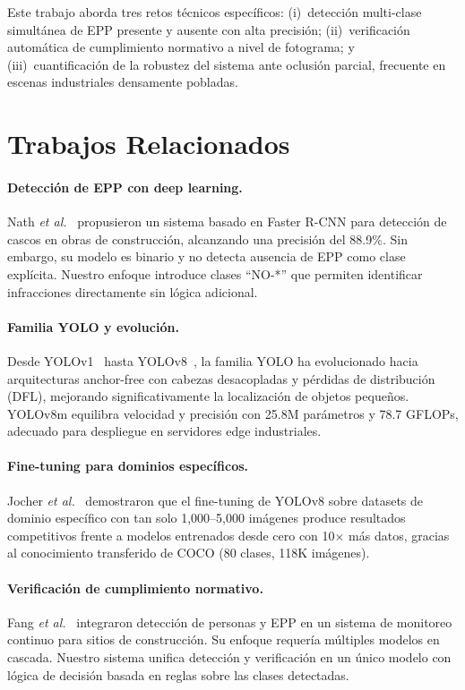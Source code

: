 \documentclass{article}
\begin{document}
Este trabajo aborda tres retos técnicos específicos: (i)~detección
multi-clase simultánea de EPP presente y ausente con alta precisión;
(ii)~verificación automática de cumplimiento normativo a nivel de
fotograma; y (iii)~cuantificación de la robustez del sistema ante
oclusión parcial, frecuente en escenas industriales densamente pobladas.

\section{Trabajos Relacionados}
\label{sec:related}

\paragraph{Detección de EPP con deep learning.}
Nath \emph{et al.}~\cite{nath2020ppe} propusieron un sistema basado en
Faster R-CNN para detección de cascos en obras de construcción,
alcanzando una precisión del 88.9\%. Sin embargo, su modelo es binario
y no detecta ausencia de EPP como clase explícita. Nuestro enfoque
introduce clases ``NO-*'' que permiten identificar infracciones
directamente sin lógica adicional.

\paragraph{Familia YOLO y evolución.}
Desde YOLOv1~\cite{redmon2016yolo} hasta YOLOv8~\cite{jocher2023yolov8},
la familia YOLO ha evolucionado hacia arquitecturas anchor-free con
cabezas desacopladas y pérdidas de distribución (DFL), mejorando
significativamente la localización de objetos pequeños. YOLOv8m
equilibra velocidad y precisión con 25.8M parámetros y 78.7 GFLOPs,
adecuado para despliegue en servidores edge industriales.

\paragraph{Fine-tuning para dominios específicos.}
Jocher \emph{et al.}~\cite{jocher2023yolov8} demostraron que el
fine-tuning de YOLOv8 sobre datasets de dominio específico con tan
solo 1{,}000--5{,}000 imágenes produce resultados competitivos frente a
modelos entrenados desde cero con 10$\times$ más datos, gracias al
conocimiento transferido de COCO (80 clases, 118K imágenes).

\paragraph{Verificación de cumplimiento normativo.}
Fang \emph{et al.}~\cite{fang2018detecting} integraron detección de
personas y EPP en un sistema de monitoreo continuo para sitios de
construcción. Su enfoque requería múltiples modelos en cascada.
Nuestro sistema unifica detección y verificación en un único modelo
con lógica de decisión basada en reglas sobre las clases detectadas.
\end{document}
